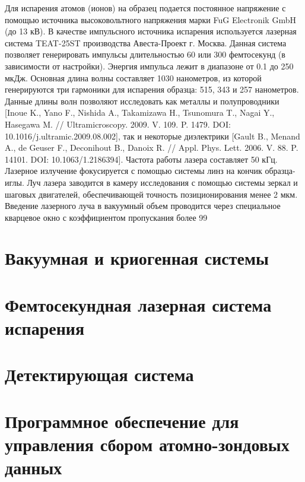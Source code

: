 Для испарения атомов (ионов) на образец подается постоянное напряжение с помощью источника высоковольтного напряжения марки FuG Electronik GmbH (до 13 кВ). В качестве импульсного источника испарения используется лазерная система TEAT-25ST производства Авеста-Проект г. Москва. Данная система позволяет генерировать импульсы длительностью 60 или 300 фемтосекунд (в зависимости от настройки). Энергия импульса лежит в диапазоне от 0.1 до 250 мкДж. Основная длина волны составляет 1030 нанометров, из которой генерируются три гармоники для испарения образца: 515, 343 и 257 нанометров. Данные длины волн позволяют исследовать как металлы и полупроводники [Inoue K., Yano F., Nishida A., Takamizawa H., Tsunomura T., Nagai Y., Hasegawa M. // Ultramicroscopy. 2009. V. 109. P. 1479. DOI: 10.1016/j.ultramic.2009.08.002], так и некоторые диэлектрики [Gault B., Menand A., de Geuser F., Deconihout B., Danoix R. // Appl. Phys. Lett. 2006. V. 88. P. 14101. DOI: 10.1063/1.2186394]. Частота работы лазера составляет 50 кГц. Лазерное излучение фокусируется с помощью системы линз на кончик образца-иглы. Луч лазера заводится в камеру исследования с помощью системы зеркал и шаговых двигателей, обеспечивающей точность позиционирования менее 2 мкм. Введение лазерного луча в вакуумный объем проводится через специальное кварцевое окно с коэффициентом пропускания более 99%

\section{Вакуумная и криогенная системы}\label{sec:ch2/sec2}

\section{Фемтосекундная лазерная система испарения}\label{sec:ch2/sec3}

\section{Детектирующая система}\label{sec:ch2/sec4}

\section{Программное обеспечение для управления сбором атомно-зондовых данных}\label{sec:ch2/sec5}



